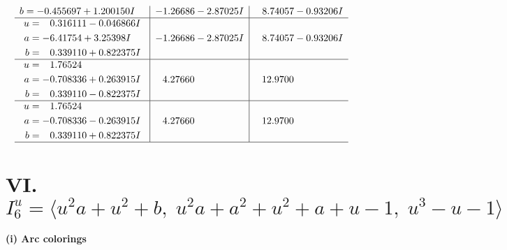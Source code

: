 \documentclass[1p]{elsarticle_modified}
\theoremstyle{definition}
\begin{document}
$$\begin{array}{c|c|c}
\begin{aligned}
b &= -0.455697 + 1.200150 I\end{aligned}
 & -1.26686 - 2.87025 I & \phantom{-}8.74057 - 0.93206 I \\ \hline\begin{aligned}
u &= \phantom{-}0.316111 - 0.046866 I \\
a &= -6.41754 + 3.25398 I \\
b &= \phantom{-}0.339110 + 0.822375 I\end{aligned}
 & -1.26686 - 2.87025 I & \phantom{-}8.74057 - 0.93206 I \\ \hline\begin{aligned}
u &= \phantom{-}1.76524\phantom{ +0.000000I} \\
a &= -0.708336 + 0.263915 I \\
b &= \phantom{-}0.339110 - 0.822375 I\end{aligned}
 & \phantom{-}4.27660\phantom{ +0.000000I} & \phantom{-}12.9700\phantom{ +0.000000I} \\ \hline\begin{aligned}
u &= \phantom{-}1.76524\phantom{ +0.000000I} \\
a &= -0.708336 - 0.263915 I \\
b &= \phantom{-}0.339110 + 0.822375 I\end{aligned}
 & \phantom{-}4.27660\phantom{ +0.000000I} & \phantom{-}12.9700\phantom{ +0.000000I}\\
 \hline 
 \end{array}$$\newpage\newpage\renewcommand{\arraystretch}{1}
\centering \section*{VI. $I^u_{6}= \langle u^2 a+u^2+b,\;u^2 a+a^2+u^2+a+u-1,\;u^3- u-1 \rangle$}
\flushleft \textbf{(i) Arc colorings}\\
\end{document}
